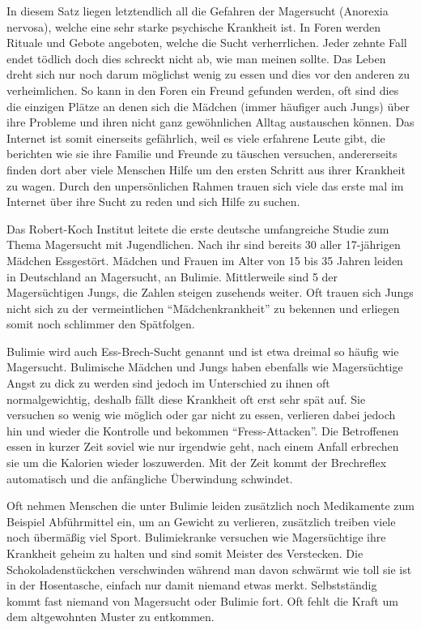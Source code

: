 In diesem Satz liegen letztendlich all die Gefahren der Magersucht (Anorexia nervosa), welche eine
sehr starke psychische Krankheit ist. In Foren werden Rituale und Gebote angeboten, welche die Sucht
verherrlichen. Jeder zehnte Fall endet tödlich doch dies schreckt nicht ab, wie man meinen sollte.
Das Leben dreht sich nur noch darum möglichst wenig zu essen und dies vor den anderen zu
verheimlichen. So kann in den Foren ein Freund gefunden werden, oft sind dies die einzigen Plätze an
denen sich die Mädchen (immer häufiger auch Jungs) über ihre Probleme und ihren
nicht ganz gewöhnlichen Alltag austauschen können. Das Internet ist somit einerseits gefährlich,
weil es viele erfahrene Leute gibt, die berichten wie sie ihre Familie und Freunde zu
täuschen versuchen, andererseits finden
dort aber viele Menschen Hilfe um den ersten Schritt aus ihrer Krankheit zu wagen. Durch den
unpersönlichen Rahmen trauen sich viele das erste mal im Internet über ihre Sucht zu reden und sich
Hilfe zu suchen.

Das Robert-Koch Institut leitete die erste deutsche umfangreiche Studie zum Thema Magersucht mit
 Jugendlichen. Nach ihr sind bereits 30\Prozent{} aller 17-jährigen Mädchen
Essgestört.  Mädchen und Frauen im Alter von 15 bis 35 Jahren leiden in Deutschland
an Magersucht,  an Bulimie. Mittlerweile sind 5\Prozent{} der Magersüchtigen Jungs,
die Zahlen steigen zusehends weiter. Oft trauen sich Jungs nicht sich zu der vermeintlichen
\enquote{Mädchenkrankheit} zu bekennen und erliegen somit noch schlimmer den Spätfolgen.

Bulimie wird auch Ess-Brech-Sucht genannt und ist etwa dreimal so häufig wie Magersucht. Bulimische
Mädchen und Jungs haben ebenfalls wie Magersüchtige Angst zu dick zu werden sind jedoch im
Unterschied zu ihnen oft normalgewichtig, deshalb fällt diese Krankheit oft erst sehr spät auf. Sie
versuchen so wenig wie möglich oder gar nicht zu essen, verlieren dabei jedoch hin und wieder die
Kontrolle und bekommen \enquote{Fress-Attacken}. Die Betroffenen essen in kurzer Zeit soviel wie nur
irgendwie geht, nach einem Anfall erbrechen sie um die Kalorien wieder loszuwerden. Mit der Zeit
kommt der Brechreflex automatisch und die anfängliche Überwindung schwindet.

Oft nehmen Menschen die unter Bulimie leiden zusätzlich noch Medikamente zum Beispiel Abführmittel
ein, um an Gewicht zu verlieren, zusätzlich treiben viele noch übermäßig viel Sport. Bulimiekranke
versuchen wie Magersüchtige ihre Krankheit geheim zu halten und sind somit Meister des Verstecken.
Die Schokoladenstückchen verschwinden während man davon schwärmt wie toll sie ist in der Hosentasche,
einfach nur damit niemand etwas merkt. Selbstständig kommt fast niemand von Magersucht oder Bulimie
fort. Oft fehlt die Kraft um dem altgewohnten Muster zu entkommen.

